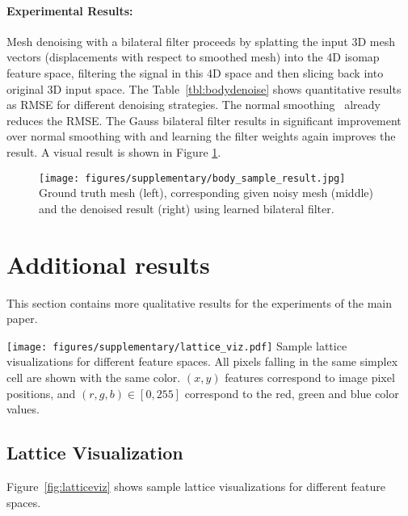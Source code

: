 \paragraph{Experimental Results:} Mesh denoising with a bilateral filter proceeds by
splatting the input 3D mesh vectors (displacements with respect to smoothed mesh) into
the 4D isomap feature space, filtering the signal in this 4D space and then slicing back
into original 3D input space. The Table~\ref{tbl:bodydenoise} shows quantitative results as RMSE
for different denoising strategies. The normal smoothing~\cite{yagou2002mesh} already reduces the RMSE. The Gauss bilateral filter
results in significant improvement over normal
smoothing with and learning the filter weights again improves the result. A visual result is shown in Figure \ref{fig:bodyresult}.

\begin{figure}[t!]
  \centering
    \texttt{[image: figures/supplementary/body\_sample\_result.jpg]}
  {Ground truth mesh (left), corresponding given noisy mesh (middle) and the denoised result (right) using learned bilateral filter.}
  \label{fig:bodyresult}
\end{figure}

\section{Additional results}
\label{sec:addresults}

This section contains more qualitative results for the experiments of the main paper.

\begin{figure*}[th!]
  \centering
    \texttt{[image: figures/supplementary/lattice\_viz.pdf]}
  {Sample lattice visualizations for different feature spaces. All pixels falling in the same simplex cell are shown with
  the same color. $(x,y)$ features correspond to image pixel positions, and $(r,g,b) \in [0,255]$ correspond
  to the red, green and blue color values.}
\label{fig:latticeviz}
\end{figure*}

\subsection{Lattice Visualization}

Figure~\ref{fig:latticeviz} shows sample lattice visualizations for different feature spaces.


